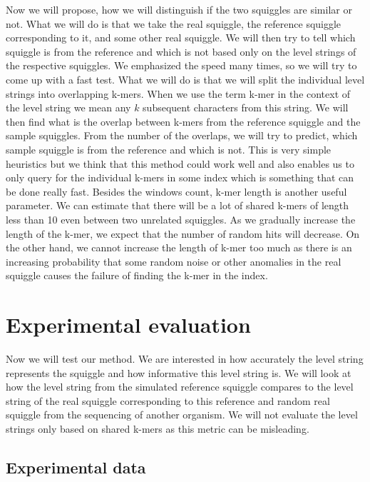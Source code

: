 Now we will propose, how we will distinguish if the two squiggles are similar or not.
What we will do is that we take the real squiggle, the reference squiggle corresponding to it, and
some other real squiggle. We will then try to tell which squiggle is from the reference
and which is not based only on the level strings of the respective squiggles. We
emphasized the speed many times, so we will try to come up with a fast test.
What we will do is that we will split the individual level strings into overlapping k-mers.
When we use the term k-mer in the context of the level string we mean any $k$ subsequent
characters from this string. We will then find what is the overlap
between k-mers from the reference squiggle and the sample squiggles. From the number of the overlaps, we will try
to predict, which sample squiggle is from the reference and which is not. This is very
simple heuristics but we think that this method could work well and also enables us
to only query for the individual k-mers in some index which is something that can be done really fast.
Besides the windows count, k-mer length is another useful parameter. We can estimate
that there will be a lot of shared k-mers of length less than 10 even between two unrelated
squiggles. As we gradually increase the length of the k-mer, we expect that the number
of random hits will decrease. On the other hand, we cannot increase the length of k-mer
too much as there is an increasing probability that some random noise or other anomalies
in the real squiggle causes the failure of finding the k-mer in the index.

\section{Experimental evaluation}

Now we will test our method. We are interested in how accurately the level string represents the squiggle
and how informative this level string is. We will look at how the level string
from the simulated reference squiggle compares to the level string of the real squiggle
corresponding to this reference and random real squiggle from the sequencing of
another organism. We will not evaluate the level strings only based on shared k-mers as this metric can be misleading.

\subsection{Experimental data}

